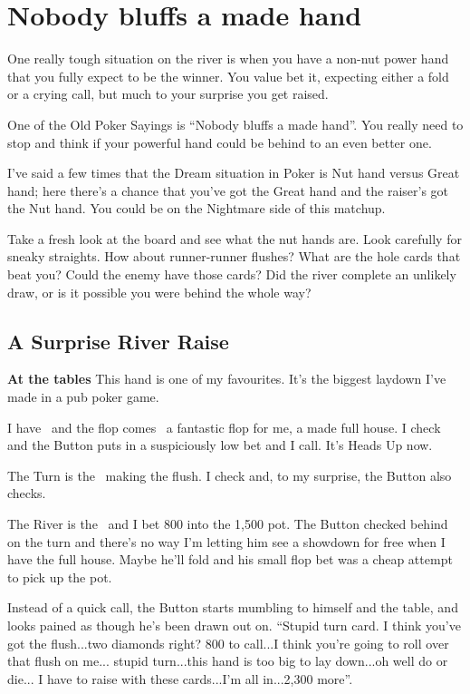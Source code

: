 \chapter{Nobody bluffs a made hand}


One really tough situation on the river is when you have a
non-nut power hand that you fully expect to be the winner.
You value bet it, expecting either a fold or a crying call,
but much to your surprise you get raised.

One of the Old Poker Sayings is ``Nobody bluffs a made hand''.
You really need to stop and think if your powerful hand could
be behind to an even better one.

I've said a few times that the Dream situation in
Poker is Nut hand versus Great hand; here there's a chance
that you've got the Great hand and the raiser's got the Nut hand.
You could be on the Nightmare side of this matchup.

Take a fresh look at the board and see what the nut hands are.
Look carefully for sneaky straights. How about runner-runner flushes?
What are the hole cards that beat you? Could the enemy
have those cards? Did the river complete an unlikely draw, or is it
possible you were behind the whole way?

\section{A Surprise River Raise}

\textbf{At the tables} This hand is one of my favourites. It's the
biggest laydown I've made in a pub poker game.

I have \trec\tres\ and the flop comes \nined\ninec\tred\, a fantastic
flop for me, a made full house. I check and the Button puts in a
suspiciously low bet and I call. It's Heads Up now.

The Turn is the \tend\, making the flush. I check and, to my
surprise, the Button also checks.

The River is the \sixs\ and I bet 800 into the 1,500 pot. The Button
checked behind on the turn and there's no way I'm letting him
see a showdown for free when I have the full house. Maybe he'll fold
and his small flop bet was a cheap attempt to pick up the pot.

Instead of a quick call, the Button starts mumbling to himself and the
table, and looks pained as though he's been drawn out on.
``Stupid turn card. I think you've got the flush...two diamonds right?
800 to call...I think you're going to roll over that flush on me...
stupid turn...this hand is too big to lay down...oh well do or die...
I have to raise with these cards...I'm all in...2,300 more''.

